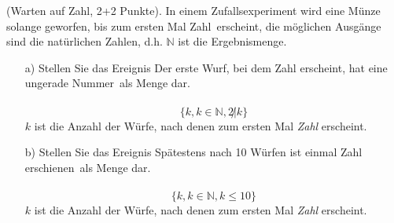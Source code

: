 \documentclass[twoside]{article}
\begin{document}
(Warten auf Zahl, 2+2 Punkte).
In einem Zufallsexperiment wird eine Münze solange geworfen, bis zum ersten Mal \dq Zahl\dq ~erscheint, die möglichen Ausgänge sind die natürlichen Zahlen, d.h. $\mathbb{N}$ ist die Ergebnismenge.
\begin{enumerate}
	\item[a)]
	Stellen Sie das Ereignis \dq Der erste Wurf, bei dem Zahl erscheint, hat eine ungerade Nummer\dq ~als Menge dar.\\\vspace{.5cm}\\
	\[
		\{k, k \in \mathbb{N}, 2 \not | k\}
	\]
	$k$ ist die Anzahl der Würfe, nach denen zum ersten Mal \textit{Zahl} erscheint.
	\item[b)] Stellen Sie das Ereignis \dq Spätestens nach 10 Würfen ist einmal Zahl erschienen\dq ~als Menge dar.\\\vspace{.5cm}\\
	\[
		\{k, k \in \mathbb{N}, k \leq 10\}
	\]
	$k$ ist die Anzahl der Würfe, nach denen zum ersten Mal \textit{Zahl} erscheint.
\end{enumerate}
\end{document}
